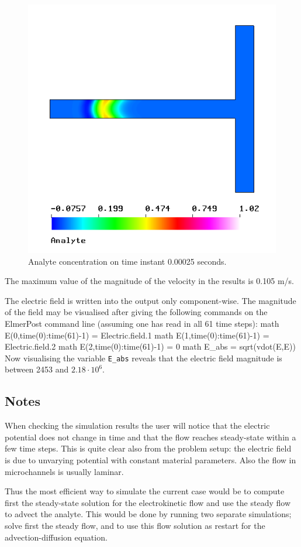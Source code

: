 \begin{figure}[bht]
\begin{center}
  \includegraphics[height=0.55\textwidth]{analyte_tutorial.png}
\end{center}
\caption{Analyte concentration on time instant 0.00025 seconds.}
\label{fig:analyte_ek}
\end{figure}
 
The maximum value of the magnitude of the velocity in the results is
0.105 m/s.

The electric field is written into the output only component-wise. The
magnitude of the field may be visualised after giving the following
commands on the ElmerPost command line (assuming one has read in all
61 time steps):
%
\ttbegin
math E(0,time(0):time(61)-1) = Electric.field.1
math E(1,time(0):time(61)-1) = Electric.field.2
math E(2,time(0):time(61)-1) = 0
math E_abs = sqrt(vdot(E,E))
\ttend
%
Now visualising the variable \texttt{E\_abs} reveals that the electric
field magnitude is between 2453 and $2.18\cdot10^6$.


\subsection*{Notes}

When checking the simulation results the user will notice that the
electric potential does not change in time and that the flow reaches
steady-state within a few time steps. This is quite clear also from the
problem setup: the electric field is due to unvarying potential with
constant material parameters. Also the flow in microchannels is
usually laminar.

Thus the most efficient way to simulate the current case would be to
compute first the steady-state solution for the electrokinetic flow
and use the steady flow to advect the analyte. This would be done by
running two separate simulations; solve first the steady flow,
and to use this flow solution as restart for the advection-diffusion
equation.



\hfill